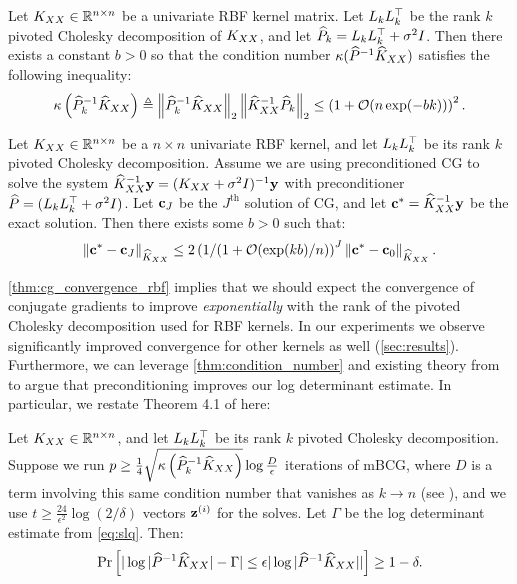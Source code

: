 \begin{lemma}
  \label{thm:condition_number}
  Let $K_{XX} \in \mathbb{R}^{n \times n}$ be a univariate RBF kernel matrix.
  Let $L_{k} L_k^\top$ be the rank $k$ pivoted Cholesky decomposition of $K_{XX}$, and let $\widehat{P}_{k} = L_k L_k^\top + \sigma^{2}I$.
  Then there exists a constant $b>0$ so that the condition number $\kappa(\widehat{P}^{-1}\widehat{K}_{XX})$ satisfies the following inequality:
  \begin{equation}
    \kappa \left( \trainP_{k}^{-1}\trainK \right)
    \triangleq \left\Vert \trainP_{k}^{-1}\trainK \right\Vert_{2} \left\Vert \trainK^{-1}\trainP_{k} \right\Vert_{2}
    \leq \left( 1 + \bigo{n\exp(-bk)} \right)^2.
  \end{equation}
\end{lemma}
\begin{theorem}
  \label{thm:cg_convergence_rbf}
  Let $K_{XX} \in \mathbb{R}^{n \times n}$ be a $n \times n$ univariate RBF kernel, and let $L_k L_k^\top$ be its rank $k$ pivoted Cholesky decomposition.
  Assume we are using preconditioned CG to solve the system $\widehat{K}_{XX}^{-1} \mathbf{y} = (K_{XX} + \sigma^2 I)^{-1} \mathbf{y}$ with preconditioner $\widehat{P} = (L_k L_k^\top + \sigma^2 I)$.
  Let $\mathbf{c}_J$ be the $J^\textrm{th}$ solution of CG, and let $\mathbf{c}^{*} = \widehat{K}_{XX}^{-1} \mathbf{y}$ be the exact solution.
  Then there exists some $b > 0$ such that:
  \begin{equation}
    \Vert \bc^{*} - \bc_{J} \Vert_{\trainK}
    \leq 2 \left(1/(1 + \bigo{\exp(kb)/n}\right)^{J} \left\Vert \bc^{*} - \bc_{0} \right\Vert_{\trainK}.
  \end{equation}
\end{theorem}
%
\cref{thm:cg_convergence_rbf} implies that we should expect the convergence of conjugate gradients to improve \emph{exponentially} with the rank of the pivoted Cholesky decomposition used for RBF kernels. In our experiments we observe significantly improved convergence for other kernels as well (\cref{sec:results}). Furthermore, we can leverage \cref{thm:condition_number} and existing theory from \cite{ubaru2017fast} to argue that preconditioning improves our log determinant estimate. In particular, we restate Theorem 4.1 of \citet{ubaru2017fast} here:
\begin{theorem}
  \label{thm:slq_convergence}
  Let $K_{XX} \in \mathbb{R}^{n \times n}$, and let $L_k L_k^\top$ be its rank $k$ pivoted Cholesky decomposition.
  Suppose we run $p \geq \frac{1}{4} \sqrt{ \kappa \left( \widehat{P}_{k}^{-1}\widehat{K}_{XX} \right) } \log \frac{D}{\epsilon}$ iterations of mBCG,
  where $D$ is a term involving this same condition number that vanishes as $k \to n$ (see \cite{ubaru2017fast}),
  and we use $t \geq \frac{24}{\epsilon^{2}}\log(2/\delta)$ vectors $\mathbf{z}^{(i)}$ for the solves.
  Let $\Gamma$ be the log determinant estimate from \eqref{eq:slq}. Then:
  \begin{equation}
    \textrm{Pr}\left[\vert \log \vert \widehat{P}^{-1}\widehat{K}_{XX} \vert - \Gamma \vert \leq \epsilon\vert \log \vert \widehat{P}^{-1}\widehat{K}_{XX} \vert \vert \right] \geq 1 - \delta.
  \end{equation}
\end{theorem}
